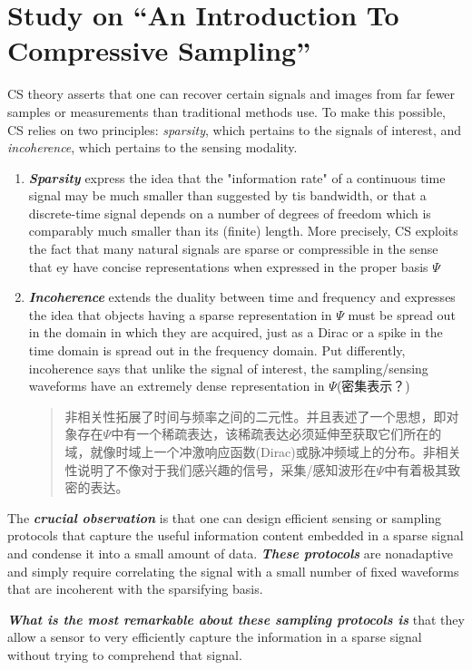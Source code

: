\chapter{Study on ``An Introduction To Compressive Sampling''\cite{Candes2008}}
CS theory asserts that one can  recover certain signals and images from far fewer samples or measurements than traditional methods use. To make this possible, CS relies on two principles: \emph{sparsity}, which pertains to the signals of interest, and \emph{incoherence}, which pertains to the sensing modality.
\begin{enumerate}
	\item \textbf{\emph{Sparsity}} express the idea that the "information rate" of a continuous time signal may be much smaller than suggested by tis bandwidth, or that a discrete-time signal depends on a number of degrees of freedom which is comparably much smaller than its (finite) length. More precisely, CS exploits the fact that many natural signals are sparse or compressible in the sense that ey have concise representations when expressed in the proper basis $\Psi$
	\item \textbf{\emph{Incoherence}} extends the duality between time and frequency and expresses the idea that objects having a sparse representation in $\Psi$ must be spread out in the domain in which they are acquired, just as a Dirac or a spike in the time domain is spread out in the frequency domain. Put differently, incoherence says that  \textcolor[rgb]{1,0,0}{unlike the signal of interest, the sampling/sensing waveforms have an extremely dense representation in $\Psi$(密集表示？)}
	\begin{quote}
		非相关性拓展了时间与频率之间的二元性。并且表述了一个思想，即对象存在$\Psi$中有一个稀疏表达，该稀疏表达必须延伸至获取它们所在的域，就像时域上一个冲激响应函数(Dirac)或脉冲频域上的分布。非相关性说明了不像对于我们感兴趣的信号，采集/感知波形在$\Psi$中有着极其致密的表达。
	\end{quote}
\end{enumerate}
The \emph{\textbf{crucial observation}} is that one can design efficient sensing or sampling protocols that capture the useful information content embedded in a sparse signal and condense it into a small amount of data. \emph{\textbf{These protocols}} are \textcolor[rgb]{1,0,0}{nonadaptive} and simply require \textcolor[rgb]{1,0,0}{correlating the signal with a small number of fixed waveforms that are incoherent with the sparsifying basis}.

\emph{\textbf{What is the most remarkable about these sampling protocols is}} that they allow a sensor to very efficiently capture the information in a sparse signal \textcolor[rgb]{1,0,0}{without trying to comprehend that signal}.

